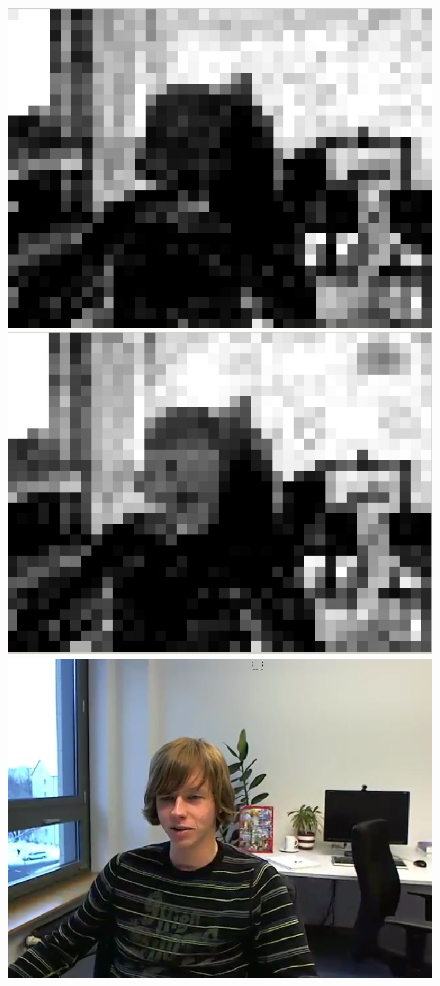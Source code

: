 \documentclass[11pt]{article} %
\begin{document}
\begin{figure}[!h]
	\centering
	\includegraphics[scale=0.4]{PaulDefault120_91250kbps_psnr}
	\includegraphics[scale=0.4]{BufferControl/paul120_250kbps_BufferControl_psnr}
	\includegraphics[scale=0.4]{PaulDefault120_91250kbps}

\end{figure}
\end{document}
